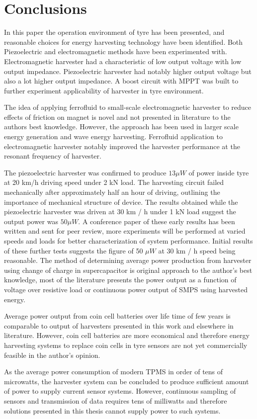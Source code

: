 \section{Conclusions}
In this paper the operation environment of tyre has been presented, and reasonable choices for energy harvesting technology have been identified. Both Piezoelectric and electromagnetic methods have been experimented with. Electromagnetic harvester had a characteristic of low output voltage with low output impedance. Piezoelectric harvester had notably higher output voltage but also a lot higher output impedance. A boost circuit with MPPT was built to further experiment applicability of harvester in tyre environment. 

The idea of applying ferrofluid to small-scale electromagnetic harvester to reduce effects of friction on magnet is novel and not presented in literature to the authors best knowledge. However, the approach has been used in larger scale energy generation and wave energy harvesting. Ferrofluid application to electromagnetic harvester notably improved the harvester performance at the resonant frequency of harvester. 

The piezoelectric harvester was confirmed to produce $13 \mu W$ of power inside tyre at 20 km/h driving speed under 2 kN load. The harvesting circuit failed mechanically after approximately half an hour of driving, outlining the importance of mechanical structure of device. The results obtained while the piezoelectric harvester was driven at 30 km / h under 1 kN load suggest the output power was $50 \mu W$. A conference paper of these early results has been written and sent for peer review, more experiments will be performed at varied speeds and loads for better characterization of system performance. Initial results of these further tests suggests the figure of 50 $\mu W$ at 30 km / h speed being reasonable. The method of determining average power production from harvester using change of charge in supercapacitor is original approach to the author's best knowledge, most of the literature presents the power output as a function of voltage over resistive load or continuous power output of SMPS using harvested energy.  

Average power output from coin cell batteries over life time of few years is comparable to output of harvesters presented in this work and elsewhere in literature. However, coin cell batteries are more economical and therefore energy harvesting systems to replace coin cells in tyre sensors are not yet commercially feasible in the author's opinion.

As the average power consumption of modern TPMS in order of tens of microwatts, the harvester system can be concluded to produce sufficient amount of power to supply current sensor systems. However, continuous sampling of sensors and transmission of data requires tens of milliwatts and therefore solutions presented in this thesis cannot supply power to such systems. 